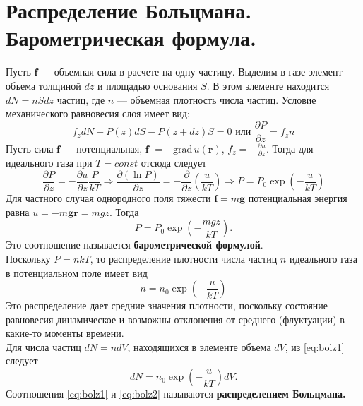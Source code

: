 \section{\normalsize Распределение Больцмана. Барометрическая формула.} Пусть $\mathbf{f}$ --- объемная сила в расчете на одну частицу. Выделим в газе элемент объема толщиной $dz$ и площадью основания $S$. В этом элементе находится $dN=nSdz$ частиц, где $n$ --- объемная плотность числа частиц. Условие механического равновесия слоя имеет вид:
\[f_zdN+P(z)dS-P(z+dz)S=0\text{ или }\frac{\partial P}{\partial z}=f_zn  \] 
Пусть сила $\mathbf{f}$ --- потенциальная, $\mathbf{f}$ $=-\text{grad}\,u(\mathbf{r})$, $f_z=-\frac{\partial u}{\partial z}$. Тогда для идеального газа при $T=const$ отсюда следует
\[\frac{\partial P}{\partial z}=-\frac{\partial u}{\partial z}\frac{P}{kT}\Rightarrow\frac{\partial(\ln P)}{\partial z}=-\frac{\partial}{\partial z}\left(\frac{u}{kT}\right)\Rightarrow P=P_0\exp\left(-\frac{u}{kT}\right) \]
Для частного случая однородного поля тяжести $\mathbf{f}=m\mathbf{g}$ потенциальная энергия равна $u=-m\mathbf{gr}=mgz$. Тогда
\[P=P_0\exp\left(-\frac{mgz}{kT}\right).  \]
Это соотношение называется \textbf{барометрической формулой}.\\
Поскольку $P=nkT$, то распределение плотности числа частиц $n$ идеального газа в потенциальном поле имеет вид
\begin{equation}
\label{eq:bolz1}
n=n_0\exp\left(-\frac{u}{kT}\right)
\end{equation}
Это распределение дает средние значения плотности, поскольку состояние равновесия динамическое и возможны отклонения от среднего (флуктуации) в какие-то моменты времени.\\
Для числа частиц $dN=ndV$, находящихся в элементе объема $dV$, из \eqref{eq:bolz1} следует
\begin{equation}
\label{eq:bolz2}
dN=n_0\exp\left(-\frac{u}{kT}\right)dV.
\end{equation}
Соотношения \eqref{eq:bolz1} и \eqref{eq:bolz2} называются \textbf{распределением Больцмана.}